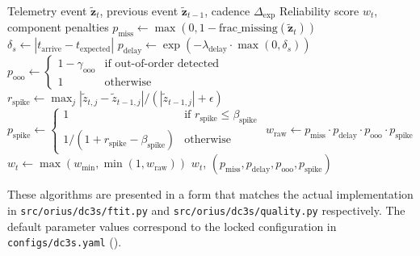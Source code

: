 \documentclass[11pt,a4paper]{article}
\begin{document}
\begin{algorithm}[htbp]
\caption{Reliability scoring from raw telemetry}
\label{alg:reliability}
\begin{algorithmic}[1]
\Require Telemetry event $\tilde{\mathbf{z}}_t$, previous event $\tilde{\mathbf{z}}_{t-1}$, cadence $\Delta_{\text{exp}}$
\Ensure Reliability score $w_t$, component penalties
\State $p_{\text{miss}} \gets \max(0, 1 - \text{frac\_missing}(\tilde{\mathbf{z}}_t))$
\State $\delta_s \gets |t_{\text{arrive}} - t_{\text{expected}}|$ 
\State $p_{\text{delay}} \gets \exp(-\lambda_{\text{delay}} \cdot \max(0, \delta_s))$ 
\State $p_{\text{ooo}} \gets \begin{cases} 1 - \gamma_{\text{ooo}} & \text{if out-of-order detected} \\ 1 & \text{otherwise} \end{cases}$ 
\State $r_{\text{spike}} \gets \max_j |\tilde{z}_{t,j} - \tilde{z}_{t-1,j}| / (|\tilde{z}_{t-1,j}| + \epsilon)$ 
\State $p_{\text{spike}} \gets \begin{cases} 1 & \text{if } r_{\text{spike}} \le \beta_{\text{spike}} \\ 1/(1 + r_{\text{spike}} - \beta_{\text{spike}}) & \text{otherwise} \end{cases}$ 
\State $w_{\text{raw}} \gets p_{\text{miss}} \cdot p_{\text{delay}} \cdot p_{\text{ooo}} \cdot p_{\text{spike}}$
\State $w_t \gets \max(w_{\min}, \min(1, w_{\text{raw}}))$ 
\State \Return $w_t$, $(p_{\text{miss}}, p_{\text{delay}}, p_{\text{ooo}}, p_{\text{spike}})$
\end{algorithmic}
\end{algorithm}

These algorithms are presented in a form that matches the actual implementation in \texttt{src/orius/dc3s/ftit.py} and \texttt{src/orius/dc3s/quality.py} respectively. The default parameter values correspond to the locked configuration in \texttt{configs/dc3s.yaml} ().
\end{document}
